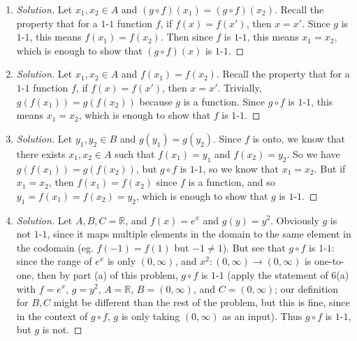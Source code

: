 \documentclass{article}
\newcommand{\R}{{\mathbb R}}
\begin{document}
\begin{enumerate}
\item \begin{proof}[Solution]\let\qed\relax
Let $x_1,x_2 \in A$ and $(g\circ f)(x_1) = (g \circ f)(x_2)$.
Recall the property that for a $1$-$1$ function $f$, if $f(x) = f(x')$, then $x=x'$.
Since $g$ is $1$-$1$, this means $f(x_1) = f(x_2)$.
Then since $f$ is $1$-$1$, this means $x_1 = x_2$,
which is enough to show that $(g \circ f)(x)$ is $1$-$1$.
\end{proof}
\item \begin{proof}[Solution]\let\qed\relax
Let $x_1,x_2 \in A$ and $f(x_1) = f(x_2)$.
Recall the property that for a $1$-$1$ function $f$, if $f(x) = f(x')$, then $x=x'$.
Trivially, $g(f(x_1)) = g(f(x_2))$ because $g$ is a function.
Since $g \circ f$ is $1$-$1$, this means $x_1 = x_2$,
which is enough to show that $f$ is $1$-$1$.
\end{proof}
\item \begin{proof}[Solution]\let\qed\relax
Let $y_1,y_2 \in B$ and $g(y_1) = g(y_2)$.
Since $f$ is onto, we know that there exists $x_1,x_2\in A$
such that $f(x_1) = y_1$ and $f(x_2) = y_2$.
So we have $g(f(x_1)) = g(f(x_2))$,
but $g \circ f$ is $1$-$1$,
so we know that $x_1 = x_2$.
But if $x_1 = x_2$, then $f(x_1) = f(x_2)$ since $f$ is a function,
and so $y_1 = f(x_1) = f(x_2) = y_2$,
which is enough to show that $g$ is $1$-$1$.
\end{proof}
\item \begin{proof}[Solution]\let\qed\relax
Let $A,B,C = \R$, and $f(x) = e^x$ and $g(y) = y^2$.
Obviously $g$ is not $1$-$1$,
since it maps multiple elements in the domain
to the same element in the codomain (eg. $f(-1)=f(1)$ but $-1\neq 1$).
But see that $g \circ f$ is $1$-$1$:
since the range of $e^x$ is only $(0,\infty)$,
and $x^2 \colon (0,\infty) \to (0,\infty)$ is one-to-one,
then by part (a) of this problem,
$g \circ f$ is $1$-$1$
(apply the statement of 6(a) with $f=e^x$, $g=y^2$, $A=\R$, $B=(0,\infty)$, and $C=(0,\infty)$;
our definition for $B,C$ might be different than the rest of the problem,
but this is fine, since in the context of $g \circ f$,
$g$ is only taking $(0,\infty)$ as an input).
Thus $g \circ f$ is $1$-$1$, but $g$ is not.
\end{proof}
\end{enumerate}
\clearpage
\end{document}

